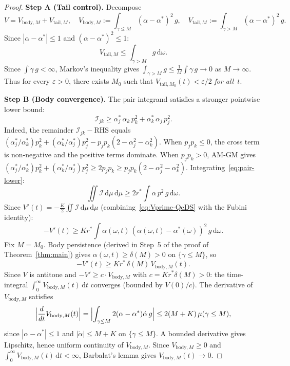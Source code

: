 \documentclass[11pt,a4paper]{article}
\theoremstyle{definition}
\begin{document}
\begin{proof}
\textbf{Step A (Tail control).} Decompose
\[
V = V_{\mathrm{body},M} + V_{\mathrm{tail},M}, \quad
V_{\mathrm{body},M} := \int_{\gamma \leq M} (\alpha - \alpha^*)^2\,g, \quad
V_{\mathrm{tail},M} := \int_{\gamma > M} (\alpha - \alpha^*)^2\,g.
\]
Since $|\alpha - \alpha^*| \leq 1$ and $(\alpha - \alpha^*)^2 \leq 1$:
\[
V_{\mathrm{tail},M} \leq \int_{\gamma > M} g\,\mathrm{d}\omega.
\]
Since $\int \gamma\,g < \infty$, Markov's inequality gives $\int_{\gamma > M} g \leq \frac{1}{M}\int \gamma\,g \to 0$ as $M \to \infty$. Thus for every $\varepsilon > 0$, there exists $M_0$ such that $V_{\mathrm{tail},M_0}(t) < \varepsilon/2$ \emph{for all~$t$}.

\textbf{Step B (Body convergence).} The pair integrand satisfies a stronger pointwise lower bound:
\begin{equation}\label{eq:pair-lower}
\mathcal{I}_{jk} \geq \alpha^*_j\,\alpha_k\,p_k^2 + \alpha^*_k\,\alpha_j\,p_j^2.
\end{equation}
Indeed, the remainder $\mathcal{I}_{jk} - \text{RHS}$ equals $(\alpha^*_j/\alpha^*_k)p_k^2 + (\alpha^*_k/\alpha^*_j)p_j^2 - p_jp_k(2-\alpha_j^2-\alpha_k^2)$. When $p_jp_k \leq 0$, the cross term is non-negative and the positive terms dominate. When $p_jp_k > 0$, AM-GM gives $(\alpha^*_j/\alpha^*_k)p_k^2 + (\alpha^*_k/\alpha^*_j)p_j^2 \geq 2p_jp_k \geq p_jp_k(2-\alpha_j^2-\alpha_k^2)$. Integrating~\eqref{eq:pair-lower}:
\[
\iint \mathcal{I}\,\mathrm{d}\mu\,\mathrm{d}\mu \geq 2r^*\int \alpha\,p^2\,g\,\mathrm{d}\omega.
\]
Since $V'(t) = -\frac{K}{2}\iint \mathcal{I}\,\mathrm{d}\mu\,\mathrm{d}\mu$ (combining~\eqref{eq:Vprime-QeDS} with the Fubini identity):
\begin{equation}\label{eq:coercive-alpha}
-V'(t) \geq Kr^*\int \alpha(\omega,t)\,(\alpha(\omega,t)-\alpha^*(\omega))^2\,g\,\mathrm{d}\omega.
\end{equation}
Fix $M = M_0$. Body persistence (derived in Step~5 of the proof of Theorem~\ref{thm:main}) gives $\alpha(\omega,t) \geq \delta(M) > 0$ on $\{\gamma \leq M\}$, so
\[
-V'(t) \geq Kr^*\,\delta(M)\,V_{\mathrm{body},M}(t).
\]
Since $V$ is antitone and $-V' \geq c \cdot V_{\mathrm{body},M}$ with $c = Kr^*\delta(M) > 0$: the time-integral $\int_0^\infty V_{\mathrm{body},M}(t)\,\mathrm{d}t$ converges (bounded by $V(0)/c$). The derivative of $V_{\mathrm{body},M}$ satisfies
\[
\Bigl|\frac{d}{dt}V_{\mathrm{body},M}(t)\Bigr| = \Bigl|\int_{\gamma \leq M} 2(\alpha - \alpha^*)\dot\alpha\,g\Bigr| \leq 2(M+K)\,\mu(\gamma \leq M),
\]
since $|\alpha - \alpha^*| \leq 1$ and $|\dot\alpha| \leq M + K$ on $\{\gamma \leq M\}$. A bounded derivative gives Lipschitz, hence uniform continuity of $V_{\mathrm{body},M}$. Since $V_{\mathrm{body},M} \geq 0$ and $\int_0^\infty V_{\mathrm{body},M}(t)\,\mathrm{d}t < \infty$, Barbalat's lemma gives $V_{\mathrm{body},M}(t) \to 0$.


\end{proof}
\end{document}
